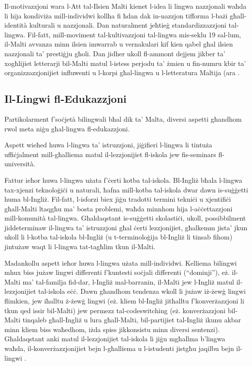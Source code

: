 \documentclass[]{../../metanetpaper}
\begin{document}
\begin{multicols}{2}
Il-motivazzjoni wara l-Att tal-Ilsien Malti kienet l-idea li lingwa nazzjonali waħda li hija kondiviża mill-individwi kollha fi ħdan dak in-nazzjon tifforma l-bażi għall-identità kulturali u nazzjonali. Dan naturalment jeħtieġ standardizzazzjoni tal-lingwa. Fil-fatt, mill-moviment tal-kultivazzjoni tal-lingwa mis-seklu 19 sal-lum, il-Malti avvanza minn ilsien imwarrab u vernakulari kif kien qabel għal ilsien nazzjonali ta’ prestiġju għoli. Dan jidher ukoll fl-ammont dejjem jikber ta’ xogħlijiet letterarji bil-Malti matul l-istess perjodu ta’ żmien u fin-numru kbir ta’ organizzazzjonijiet influwenti u l-korpi għal-lingwa u l-letteratura Maltija (ara \cite{Fabri:2011a}.

\subsection{Il-Lingwi fl-Edukazzjoni}

Partikolarment f'soċjetà bilingwali bħal dik ta’ Malta, diversi aspetti għandhom rwol meta niġu għal-lingwa fl-edukazzjoni.

Aspett wieħed huwa l-lingwa ta’ istruzzjoni, jiġifieri l-lingwa li tintuża uffiċjalment mill-għalliema matul il-lezzjonijiet fl-iskola jew fis-seminars fl-università.

Fattur ieħor huwa l-lingwa użata f'ċerti kotba tal-iskola. Bl-Ingliż bħala l-lingwa tax-xjenzi teknoloġiċi u naturali, ħafna mill-kotba tal-iskola dwar dawn is-suġġetti huma bl-Ingliż. Fil-fatt, l-isforzi biex jiġu tradotti termini tekniċi u xjentifiċi għall-Malti ltaqgħu ma’  bosta problemi, waħda minnhom hija l-aċċettazzjoni mill-komunità tal-lingwa. Għaldaqstant is-suġġetti skolastiċi, ukoll, possibbilment jiddeterminaw il-lingwa ta’ istruzzjoni għal ċerti lezzjonijiet, għalkemm jista’ jkun ukoll li l-kotba tal-iskola bl-Ingliż (u t-terminoloġija bl-Ingliż li tinsab fihom) jintużaw waqt li l-lingwa tat-tagħlim tkun il-Malti.

Madankollu aspett ieħor huwa l-lingwa użata mill-individwi. Kelliema bilingwi mhux biss jużaw lingwi differenti f'kuntesti soċjali differenti (``dominji''), eż. il-Malti ma’ tal-familja fid-dar, l-Ingliż mal-barranin, il-Malti jew l-Ingliż matul il-lezzjonijiet tal-iskola eċċ. Dawn għandhom tendenza wkoll li jużaw iż-żewġ lingwi flimkien, jew iħalltu ż-żewġ lingwi (eż. kliem bl-Ingliż jitħalltu f’konverżazzjoni li tkun qed issir bil-Malti) jew permezz tal-codeswitching (eż. konverżazzjoni bil-Malti tinqaleb għall-Ingliż u lura għall-Malti, bil-partijiet tal-Ingliż ikunu akbar minn kliem biss waħedhom, iżda spiss jikkonsistu minn diversi sentenzi). Għaldaqstant anki matul il-lezzjonijiet tal-iskola li jiġu mgħallma b’lingwa waħda, il-konverżazzjonijiet bejn l-għalliema u l-istudenti jistgħu jaqilbu bejn il-lingwi \cite{Camilleri:1995}.


\end{multicols}
\end{document}

